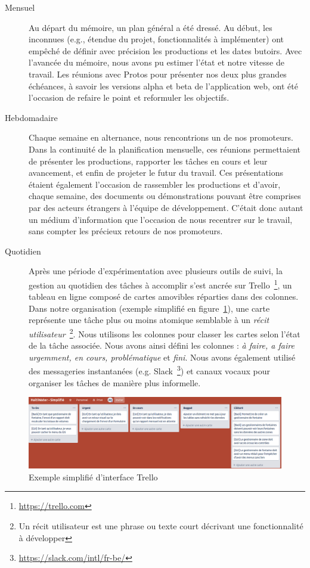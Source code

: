 \documentclass{EPL-master-thesis-covers-FR}
\begin{document}
				\begin{description}
					\item[Mensuel] Au départ du mémoire, un plan général a été dressé. Au début, les inconnues (e.g., étendue du projet, fonctionnalités à implémenter) ont empêché de définir avec précision les productions et les dates butoirs. Avec l'avancée du mémoire, nous avons pu estimer l'état et notre vitesse de travail. Les réunions avec Protos pour présenter nos deux plus grandes échéances, à savoir les versions alpha et beta de l'application web, ont été l'occasion de refaire le point et reformuler les objectifs.

					\item[Hebdomadaire] Chaque semaine en alternance, nous rencontrions un de nos promoteurs. Dans la continuité de la planification mensuelle, ces réunions permettaient de présenter les productions, rapporter les tâches en cours et leur avancement, et enfin de projeter le futur du travail. Ces présentations étaient également l'occasion de rassembler les productions et d'avoir, chaque semaine, des documents ou démonstrations pouvant être comprises par des acteurs étrangers à l'équipe de développement. C'était donc autant un médium d'information que l'occasion de nous recentrer sur le travail, sans compter les précieux retours de nos promoteurs.

					\item[Quotidien] Après une période d'expérimentation avec plusieurs outils de suivi, la gestion au quotidien des tâches à accomplir s'est ancrée sur Trello~\footnote{\url{https://trello.com}}, un tableau en ligne composé de cartes amovibles réparties dans des colonnes. Dans notre organisation (exemple simplifié en figure~\ref{fig:screen_trello_simplifie}), une carte représente une tâche plus ou moins atomique semblable à un \emph{récit utilisateur}~\footnote{Un récit utilisateur est une phrase ou texte court décrivant une fonctionnalité à développer}. Nous utilisons les colonnes pour classer les cartes selon l'état de la tâche associée. Nous avons ainsi défini les colonnes : \emph{à faire, a faire urgemment, en cours, problématique} et \emph{fini}. Nous avons également utilisé des messageries instantanées (e.g. Slack~\footnote{\url{https://slack.com/intl/fr-be/}}) et canaux vocaux pour organiser les tâches de manière plus informelle.
				\end{description}

				\begin{figure}
					\includegraphics[width=\textwidth]{images/screen_trello_simplifie}
					\caption{Exemple simplifié d'interface Trello}
					\label{fig:screen_trello_simplifie}
				\end{figure}
\end{document}
